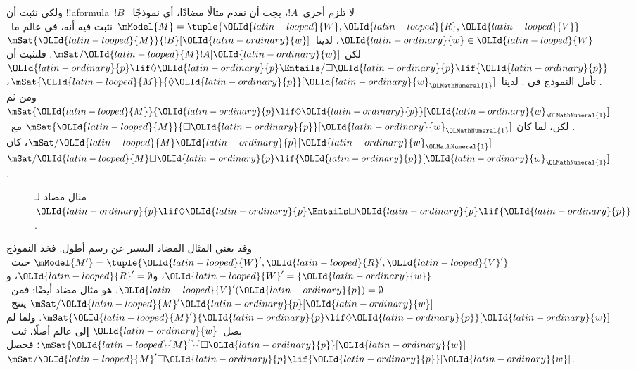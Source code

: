 \documentclass[../../../include/open-logic-section]{subfiles}
\begin{document}
\begin{ex}
  ولكي نثبت أن !!a{formula}~$!B$ لا تلزم أخرى~$!A$، يجب أن نقدم
  مثالًا مضادًا، أي نموذجًا~$\mModel{M} = \tuple{{\OLId{latin-looped}{W}}, {\OLId{latin-looped}{R}}, {\OLId{latin-looped}{V}}}$ نثبت فيه
  أنه، في عالم ما~${\OLId{latin-ordinary}{w}} \in {\OLId{latin-looped}{W}}$، لدينا~$\mSat{{\OLId{latin-looped}{M}}}{!B}[{\OLId{latin-ordinary}{w}}]$ لكن
  $\mSat/{{\OLId{latin-looped}{M}}}{!A}[{\OLId{latin-ordinary}{w}}]$. فلنثبت أن
  ${\OLId{latin-ordinary}{p}} \lif \Diamond {\OLId{latin-ordinary}{p}} \Entails/ \Box {\OLId{latin-ordinary}{p}} \lif {\OLId{latin-ordinary}{p}}$. تأمل النموذج في
  . لدينا~$\mSat{{\OLId{latin-looped}{M}}}{\Diamond {\OLId{latin-ordinary}{p}}}[{\OLId{latin-ordinary}{w}}_{\OLMathNumeral{1}}]$، ومن ثم
  $\mSat{{\OLId{latin-looped}{M}}}{{\OLId{latin-ordinary}{p}} \lif \Diamond {\OLId{latin-ordinary}{p}}}[{\OLId{latin-ordinary}{w}}_{\OLMathNumeral{1}}]$. لكن، لما كان
  $\mSat{{\OLId{latin-looped}{M}}}{\Box {\OLId{latin-ordinary}{p}}}[{\OLId{latin-ordinary}{w}}_{\OLMathNumeral{1}}]$ مع~$\mSat/{{\OLId{latin-looped}{M}}}{{\OLId{latin-ordinary}{p}}}[{\OLId{latin-ordinary}{w}}_{\OLMathNumeral{1}}]$، كان
  $\mSat/{{\OLId{latin-looped}{M}}}{\Box {\OLId{latin-ordinary}{p}} \lif {\OLId{latin-ordinary}{p}}}[{\OLId{latin-ordinary}{w}}_{\OLMathNumeral{1}}]$.
  \begin{figure}
  \begin{center}
  \end{center}
  \caption{مثال مضاد لـ${\OLId{latin-ordinary}{p}} \lif \Diamond {\OLId{latin-ordinary}{p}}
  \Entails \Box {\OLId{latin-ordinary}{p}} \lif {\OLId{latin-ordinary}{p}}$.}
  \end{figure}

  وقد يغني المثال المضاد اليسير عن رسم أطول. فخذ النموذج
  $\mModel{M'} = \tuple{{\OLId{latin-looped}{W}}', {\OLId{latin-looped}{R}}', {\OLId{latin-looped}{V}}'}$ حيث~${\OLId{latin-looped}{W}}' = \{{\OLId{latin-ordinary}{w}}\}$،
  و${\OLId{latin-looped}{R}}' = \emptyset$، و${\OLId{latin-looped}{V}}'({\OLId{latin-ordinary}{p}}) = \emptyset$. هو مثال مضاد أيضًا:
  فمن~$\mSat/{{\OLId{latin-looped}{M}}'}{{\OLId{latin-ordinary}{p}}}[{\OLId{latin-ordinary}{w}}]$ ينتج~$\mSat{{\OLId{latin-looped}{M}}'}{{\OLId{latin-ordinary}{p}} \lif \Diamond {\OLId{latin-ordinary}{p}}}[{\OLId{latin-ordinary}{w}}]$.
  ولما لم يصل~${\OLId{latin-ordinary}{w}}$ إلى عالم أصلًا، ثبت~$\mSat{{\OLId{latin-looped}{M}}'}{\Box {\OLId{latin-ordinary}{p}}}[{\OLId{latin-ordinary}{w}}]$؛
  فحصل~$\mSat/{{\OLId{latin-looped}{M}}'}{\Box {\OLId{latin-ordinary}{p}} \lif {\OLId{latin-ordinary}{p}}}[{\OLId{latin-ordinary}{w}}]$.
\end{ex}
\end{document}
